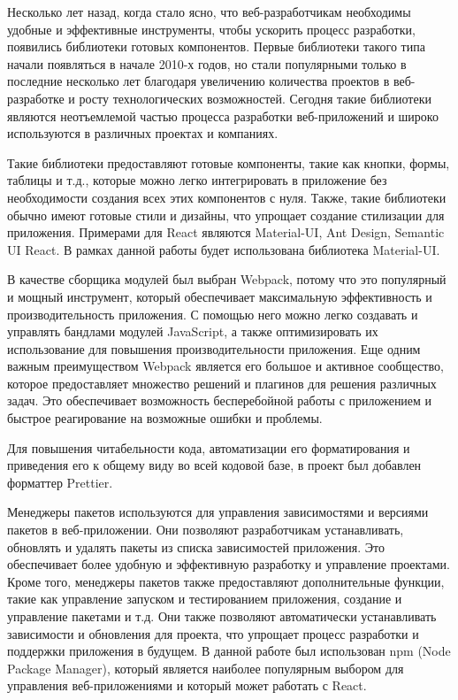 Несколько лет назад, когда стало ясно, что веб-разработчикам необходимы удобные и эффективные инструменты, чтобы ускорить процесс разработки, появились библиотеки готовых компонентов. Первые библиотеки такого типа начали появляться в начале 2010-х годов, но стали популярными только в последние несколько лет благодаря увеличению количества проектов в веб-разработке и росту технологических возможностей. Сегодня такие библиотеки являются неотъемлемой частью процесса разработки веб-приложений и широко используются в различных проектах и компаниях.

Такие библиотеки предоставляют готовые компоненты, такие как кнопки, формы, таблицы и т.д., которые можно легко интегрировать в приложение без необходимости создания всех этих компонентов с нуля. Также, такие библиотеки обычно имеют готовые стили и дизайны, что упрощает создание стилизации для приложения. Примерами для React являются Material-UI, Ant Design, Semantic UI React. В рамках данной работы будет использована библиотека Material-UI.

В качестве сборщика модулей был выбран Webpack, потому что это популярный и мощный инструмент, который обеспечивает максимальную эффективность и производительность приложения. С помощью него можно легко создавать и управлять бандлами модулей JavaScript, а также оптимизировать их использование для повышения производительности приложения. Еще одним важным преимуществом Webpack является его большое и активное сообщество, которое предоставляет множество решений и плагинов для решения различных задач. Это обеспечивает возможность бесперебойной работы с приложением и быстрое реагирование на возможные ошибки и проблемы.

Для повышения читабельности кода, автоматизации его форматирования и приведения его к общему виду во всей кодовой базе, в проект был добавлен форматтер Prettier.

Менеджеры пакетов используются для управления зависимостями и версиями пакетов в веб-приложении. Они позволяют разработчикам устанавливать, обновлять и удалять пакеты из списка зависимостей приложения. Это обеспечивает более удобную и эффективную разработку и управление проектами. Кроме того, менеджеры пакетов также предоставляют дополнительные функции, такие как управление запуском и тестированием приложения, создание и управление пакетами и т.д. Они также позволяют автоматически устанавливать зависимости и обновления для проекта, что упрощает процесс разработки и поддержки приложения в будущем. В данной работе был использован npm (Node Package Manager), который является наиболее популярным выбором для управления веб-приложениями и который может работать с React.

